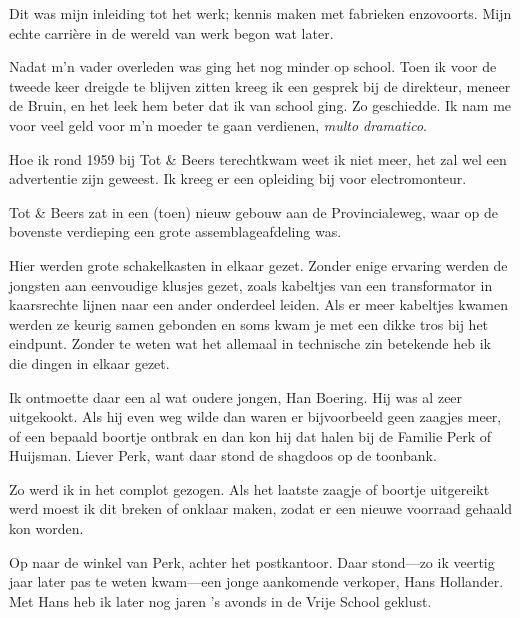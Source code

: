 \documentclass[12pt,twoside, openright]{memoir}
\begin{document}
Dit was mijn inleiding tot het werk; kennis maken met fabrieken enzovoorts. Mijn echte carrière in de wereld van werk begon wat later.

Nadat m’n vader overleden was ging het nog minder op school. Toen ik voor de tweede keer dreigde te blijven zitten kreeg ik een gesprek bij de direkteur, meneer de Bruin, en het leek hem beter dat ik van school ging. Zo geschiedde. Ik nam me voor veel geld voor m’n moeder te gaan verdienen, \emph{multo dramatico}.

Hoe ik rond 1959 bij Tot \& Beers terechtkwam weet ik niet meer, het zal wel een advertentie zijn geweest. Ik kreeg er een opleiding bij voor electromonteur.

Tot \& Beers zat in een (toen) nieuw gebouw aan de Provincialeweg, waar op de bovenste verdieping een grote assemblageafdeling was. 

Hier werden grote schakelkasten in elkaar gezet. Zonder enige ervaring werden de jongsten aan eenvoudige klusjes gezet, zoals kabeltjes van een transformator in kaarsrechte lijnen naar een ander onderdeel leiden. Als er meer kabeltjes kwamen werden ze keurig samen gebonden en soms kwam je met een dikke tros bij het eindpunt. Zonder te weten wat het allemaal in technische zin betekende heb ik die dingen in elkaar gezet. 

Ik ontmoette daar een al wat oudere jongen, Han Boering. Hij was al zeer uitgekookt. Als hij even weg wilde dan waren er bijvoorbeeld geen zaagjes meer, of een bepaald boortje ontbrak en dan kon hij dat halen bij de Familie Perk of Huijsman. Liever Perk, want daar stond de shagdoos op de toonbank. 

Zo werd ik in het complot gezogen. Als het laatste zaagje of boortje uitgereikt werd moest ik dit breken of onklaar maken, zodat er een nieuwe voorraad gehaald kon worden. 

Op naar de winkel van Perk, achter het postkantoor. Daar stond---zo ik veertig jaar later pas te weten kwam---een jonge aankomende verkoper, Hans Hollander. Met Hans heb ik later nog jaren ’s avonds in de Vrije School geklust. 
\end{document}
